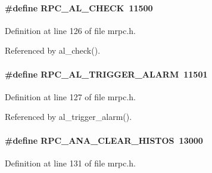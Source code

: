 \paragraph[{RPC\_\-AL\_\-CHECK}]{\setlength{\rightskip}{0pt plus 5cm}\#define RPC\_\-AL\_\-CHECK~11500}\hfill\label{group__mrpcdefineh_gaf06b2b267be4f2a46a0e5d6ba5c9be55}

\begin{DoxyItemize}
\item 
\end{DoxyItemize}

Definition at line 126 of file mrpc.h.

Referenced by al\_\-check().
\paragraph[{RPC\_\-AL\_\-TRIGGER\_\-ALARM}]{\setlength{\rightskip}{0pt plus 5cm}\#define RPC\_\-AL\_\-TRIGGER\_\-ALARM~11501}\hfill\label{group__mrpcdefineh_ga7010d8066162ac5b7dc3491ff46f45e0}

\begin{DoxyItemize}
\item 
\end{DoxyItemize}

Definition at line 127 of file mrpc.h.

Referenced by al\_\-trigger\_\-alarm().
\paragraph[{RPC\_\-ANA\_\-CLEAR\_\-HISTOS}]{\setlength{\rightskip}{0pt plus 5cm}\#define RPC\_\-ANA\_\-CLEAR\_\-HISTOS~13000}\hfill\label{group__mrpcdefineh_gab04cd68bb2484fcbaa62d2eda3100250}

\begin{DoxyItemize}
\item 
\end{DoxyItemize}

Definition at line 131 of file mrpc.h.
